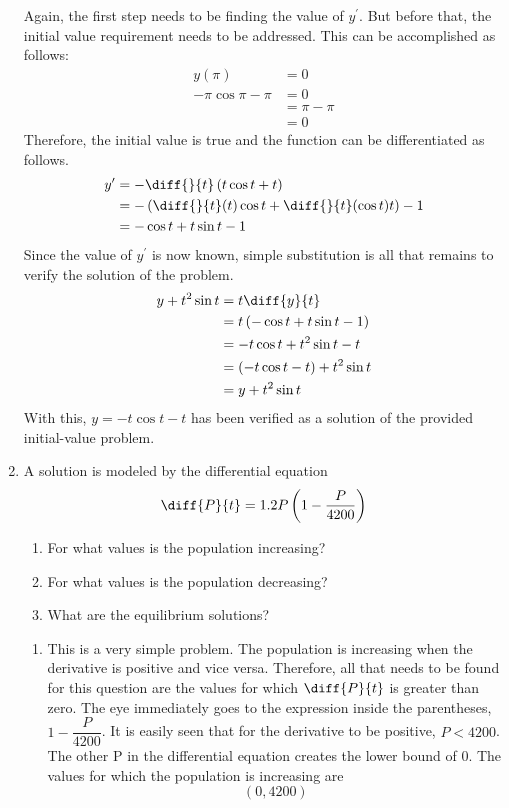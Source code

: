 \documentclass{article}
\begin{document}
\begin{enumerate}[label=\textbf{\arabic*.}]
\vspace{5pt}
Again, the first step needs to be finding the value of $y^\prime$. But before that, the initial value requirement needs to be addressed. This can be accomplished as follows:
\begin{align*}
y(\pi)&=0\\
-\pi\cos\pi-\pi &= 0\\
&=\pi-\pi\\
&= 0
\end{align*}
Therefore, the initial value is true and the function can be differentiated as follows.
\begin{align*}
y^\prime &= -\diff{}{t}\left(t\cos t+t\right)\\
&= -\left(\diff{}{t}(t)\cos t + \diff{}{t}(\cos t) t\right)-1\\
&= -\cos t +t\sin t-1
\end{align*}
Since the value of $y^\prime$ is now known, simple substitution is all that remains to verify the solution of the problem.
\begin{align*}
y+t^2\sin t &= t\diff{y}{t}\\
&= t\left(-\cos t + t\sin t -1\right)\\
&= -t\cos t+t^2\sin t -t\\
&= \left(-t\cos t-t\right)+t^2\sin t\\
&= y +t^2\sin t
\end{align*}
With this, $y = -t\cos t - t$ has been verified as a solution of the provided initial-value problem.

\newpage 

\item A solution is modeled by the differential equation 
\[\diff{P}{t} = 1.2P\left(1-\dfrac{P}{4200}\right)\]
\begin{enumerate}[label = (\alph*)]
\item For what values is the population increasing?
\item For what values is the population decreasing?
\item What are the equilibrium solutions?
\end{enumerate}


\vspace{5pt}
\begin{enumerate}[label = (\alph*)]
\item This is a very simple problem. The population is increasing when the derivative is positive and vice versa. Therefore, all that needs to be found for this question are the values for which $\diff{P}{t}$ is greater than zero. The eye immediately goes to the expression inside the parentheses, $1-\dfrac{P}{4200}$. It is easily seen that for the derivative to be positive, $P<4200$. The other P in the differential equation creates the lower bound of 0. The values for which the population is increasing are \[(0,4200)\]


\end{enumerate}
\end{enumerate}
\end{document}
